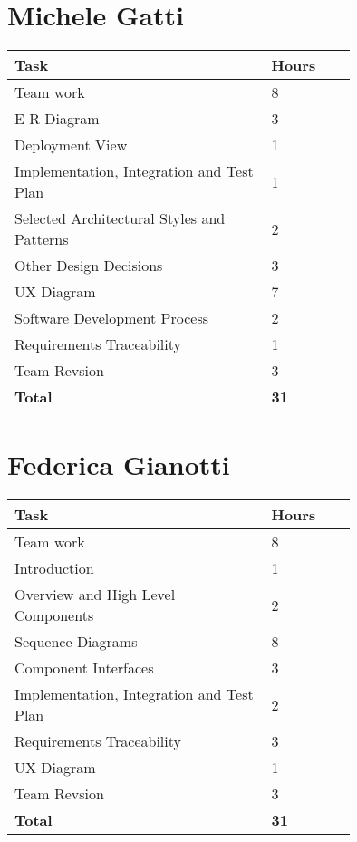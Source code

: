 \section{Michele Gatti}

\smallskip
\begin{center}
\begin{tabular}{ | p{0.75\linewidth} | l | }
  \hline
    \textbf{Task} & \textbf{Hours }\\ \hline
     Team work & 8 \\ \hline
     E-R Diagram & 3 \\ \hline
     Deployment View & 1 \\ \hline
     Implementation, Integration and Test Plan & 1 \\ \hline
     Selected Architectural Styles and Patterns & 2 \\ \hline
     Other Design Decisions & 3 \\ \hline
     UX Diagram & 7 \\ \hline
     Software Development Process & 2 \\ \hline
     Requirements Traceability & 1 \\ \hline
     Team Revsion & 3 \\ \hline
    \textbf{Total} & \textbf{31} \\ \hline
\end{tabular}
\end{center}
\smallskip


\section{Federica Gianotti}

\smallskip
\begin{center}
\begin{tabular}{ | p{0.75\linewidth} | l | }
  \hline
    \textbf{Task} & \textbf{Hours }\\ \hline
    Team work & 8 \\ \hline
    Introduction & 1 \\ \hline
    Overview and High Level Components & 2 \\ \hline
    Sequence Diagrams & 8 \\ \hline
    Component Interfaces & 3 \\ \hline
    Implementation, Integration and Test Plan & 2 \\ \hline
    Requirements Traceability & 3 \\ \hline
    UX Diagram & 1 \\ \hline
    Team Revsion & 3 \\ \hline
   \textbf{Total} & \textbf{31} \\ \hline
\end{tabular}
\end{center}
\smallskip

